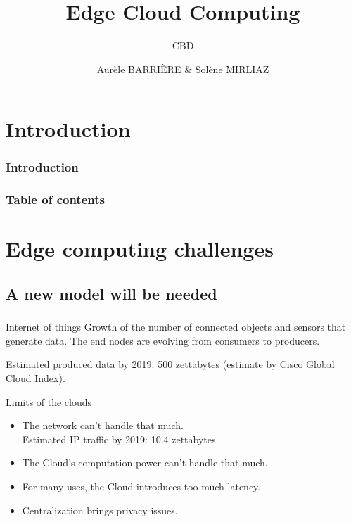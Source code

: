 \documentclass[utf8,xcolor=table, page number]{earlywinter}
\begin{document}
\title{Edge Cloud Computing}
\subtitle{CBD}
\author{Aurèle BARRIÈRE & Solène MIRLIAZ}

\begin{frame}[plain]
  \titlepage%
\end{frame}

\section{Introduction}
\begin{frame}
	\frametitle{Introduction}

\end{frame}

  \begin{frame}
    \frametitle{Table of contents}
    \tableofcontents[]
  \end{frame}
  
  
\section{Edge computing challenges}
\subsection{A new model will be needed}
\begin{frame}
  \frametitle{\subsecname}
  \begin{block}{Internet of things}
    Growth of the number of connected objects and sensors that generate data.
    The end nodes are evolving from consumers to producers.
    
    Estimated produced data by 2019: 500 zettabytes (estimate by Cisco Global Cloud Index).
  \end{block}
	\begin{alertblock}{Limits of the clouds}
          \begin{itemize}
          \item The network can't handle that much.\\
              Estimated IP traffic by 2019: 10.4 zettabytes.
            \item The Cloud's computation power can't handle that much.
	    \item For many uses, the Cloud introduces too much latency.
            \item Centralization brings privacy issues.
          \end{itemize}
	\end{alertblock}

\end{frame}
\end{document}
